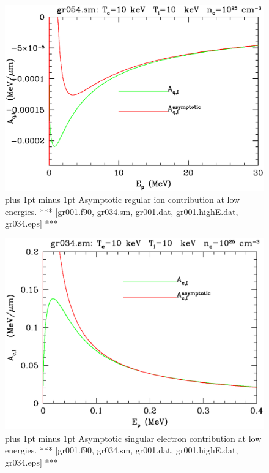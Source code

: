 \documentclass[preprint,12pt,eqsecnum,nofootinbib,amsmath,amssymb]{revtex4}
\newcommand{\footnoteskip}{\baselineskip 12pt plus 1pt minus 1pt}
\begin{document}
\pagebreak
\vskip-2cm 
\begin{figure}[h!]
\includegraphics[scale=0.45]{gr054.eps} 
\vskip-0.8cm 
\caption{\footnoteskip  
  Asymptotic regular ion contribution at low energies. 
  *** [gr001.f90, gr034.sm, gr001.dat, gr001.highE.dat, gr034.eps] ***
}
\end{figure}

\vskip-2cm 
\begin{figure}[h!]
\includegraphics[scale=0.45]{gr034.eps} 
\vskip-0.8cm 
\caption{\footnoteskip  
  Asymptotic singular electron contribution at low energies. 
  *** [gr001.f90, gr034.sm, gr001.dat, gr001.highE.dat, gr034.eps] ***
}
\end{figure}
\end{document}
